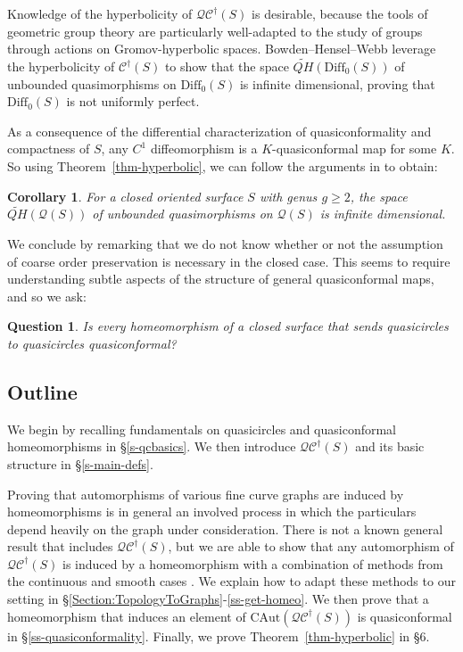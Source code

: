 \documentclass[12pt,a4paper]{amsart}
\theoremstyle{definition}
\theoremstyle{plain}
\newtheorem*{question}{Question}
\numberwithin{equation}{section}
\newcommand{\qcg}{\mathcal{QC}^{\dagger}}
\newcounter{foo}
\newtheorem{cor}[foo]{Corollary}
\begin{document}
Knowledge of the hyperbolicity of $\qcg(S)$ is desirable, because the tools of geometric group theory are particularly well-adapted to the study of groups through actions on Gromov-hyperbolic spaces. Bowden--Hensel--Webb \cite{bowden2022quasimorphisms} leverage the hyperbolicity of $\mathcal{C}^{\dagger}(S)$ to show that the space $\widetilde{QH}(\text{Diff}_0(S))$ of unbounded quasimorphisms on $\text{Diff}_0(S)$ is infinite dimensional, proving that $\text{Diff}_0(S)$ is not uniformly perfect.


As a consequence of the differential characterization of quasiconformality and compactness of $S$, any $C^1$ diffeomorphism is a $K$-quasiconformal map for some $K$. So using Theorem~\ref{thm-hyperbolic}, we can follow the arguments in \cite[Sections 4 \& 5]{bowden2022quasimorphisms} to obtain:

\begin{cor}
    For a closed oriented surface $S$ with genus $g\geq 2$, the space $\widetilde{QH}(\mathcal{Q}(S))$ of unbounded quasimorphisms on $\mathcal{Q}(S)$ is infinite dimensional.
\end{cor}


We conclude by remarking that we do not know whether or not the assumption of coarse order preservation is necessary in the closed case.
This seems to require understanding subtle aspects of the structure of general quasiconformal maps, and so we ask:

\begin{question}\label{q-is-filtration-needed}
    Is every homeomorphism of a closed surface that sends quasicircles to quasicircles quasiconformal? 
\end{question}

\subsection{Outline}
We begin by recalling fundamentals on quasicircles and quasiconformal homeomorphisms in \S \ref{s-qcbasics}.
We then introduce $\mathcal{QC}^\dagger(S)$ and its basic structure in \S \ref{s-main-defs}.

Proving that automorphisms of various fine curve graphs are induced by homeomorphisms is in general an involved process in which the particulars depend heavily on the graph under consideration.
There is not a known general result that includes $\mathcal{QC}^\dagger(S)$, but we are able to show that any automorphism of $\mathcal{QC}^\dagger(S)$ is induced by a homeomorphism with a combination of methods from the continuous and smooth cases \cite{booth2024automorphisms,long2023automorphisms}.
We explain how to adapt these methods to our setting in \S \ref{Section:TopologyToGraphs}-\ref{ss-get-homeo}.
We then prove that a homeomorphism that induces an element of $\mathrm{CAut}(\qcg(S))$ is quasiconformal in \S \ref{ss-quasiconformality}.
Finally, we prove Theorem~\ref{thm-hyperbolic} in \S 6. 
\end{document}
